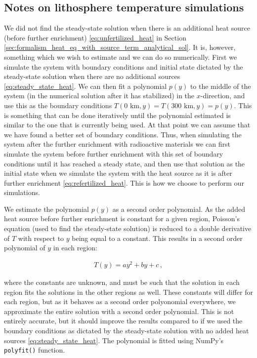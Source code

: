 \documentclass[reprint,english,notitlepage]{revtex4-1}  %
\begin{document}
\subsection{Notes on lithosphere temperature simulations} \label{sec:method_heat_sim}

We did not find the steady-state solution when there is an additional heat source (before further enrichment) \eqref{eq:unfertilized_heat} in Section \ref{sec:formalism_heat_eq_with_source_term_analytical_sol}.
It is, however, something which we wish to estimate and we can do so numerically. First we simulate the system with boundary conditions and initial state dictated by the steady-state solution when there are no additional sources \eqref{eq:steady_state_heat}. We can then fit a polynomial $p(y)$ to the middle of the system (in the numerical solution after it has stabilized) in the $x$-direction, and use this as the boundary conditions $T(0 \text{ km},y) = T(300 \text{ km},y) = p(y)$. This is something that can be done iteratively until the polynomial estimated is similar to the one that is currently being used. At that point we can assume that we have found a better set of boundary conditions. Thus, when simulating the system after the further enrichment with radioactive materials we can first simulate the system before further enrichment with this set of boundary conditions until it has reached a steady state, and then use that solution as the initial state when we simulate the system with the heat source as it is after further enrichment \eqref{eq:refertilized_heat}. This is how we choose to perform our simulations.

We estimate the polynomial $p(y)$ as a second order polynomial. As the added heat source before further enrichment is constant for a given region, Poisson's equation (used to find the steady-state solution) is reduced to a double derivative of $T$ with respect to $y$ being equal to a constant. This results in a second order polynomial of $y$ in each region:

\begin{align*}
T(y) = ay^2 + by + c \, ,
\end{align*} 

where the constants are unknown, and must be such that the solution in each region fits the solutions in the other regions as well. These constants will differ for each region, but as it behaves as a second order polyonomial everywhere, we approximate the entire solution with a second order polynomial. This is not entirely accurate, but it should improve the results compared to if we used the boundary conditions as dictated by the steady-state solution with no added heat sources \eqref{eq:steady_state_heat}. The polynomial is fitted using NumPy's \citep{numpy} \verb+polyfit()+ function.
\end{document}
